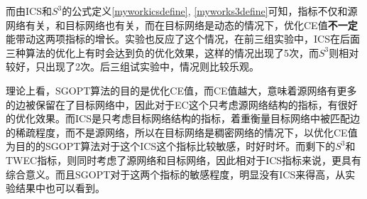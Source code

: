 而由ICS和$S^3$的公式定义\ref{myworkicsdefine}, \ref{myworks3define}可知，指标不仅和源网络有关，和目标网络也有关，而在目标网络是动态的情况下，优化CE值\textbf{不一定}能带动这两项指标的增长。实验也反应了这个情况，在前三组实验中，ICS在后面三种算法的优化上有时会达到负的优化效果，这样的情况出现了5次，而$S^3$则相对较好，只出现了2次。后三组试实验中，情况则比较乐观。

理论上看，SGOPT算法的目的是优化CE值，而CE值越大，意味着源网络有更多的边被保留在了目标网络中，因此对于EC这个只考虑源网络结构的指标，有很好的优化效果。而ICS是只考虑目标网络结构的指标，着重衡量目标网络中被匹配边的稀疏程度，而不是源网络，所以在目标网络是稠密网络的情况下，以优化CE值为目的的SGOPT算法对于这个ICS这个指标比较敏感，时好时坏。而剩下的$S^3$和TWEC指标，则同时考虑了源网络和目标网络，因此相对于ICS指标来说，更具有综合意义。而且SGOPT对于这两个指标的敏感程度，明显没有ICS来得高，从实验结果中也可以看到。


